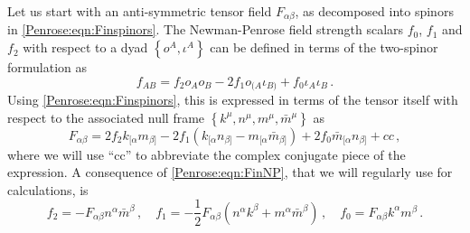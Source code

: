 Let us start with an anti-symmetric tensor field $F_{\alpha \beta}$, as decomposed into spinors in \eqref{Penrose:eqn:Finspinors}. The Newman-Penrose field strength scalars $f_0$, $f_1$ and $f_2$ with respect to a dyad  $\left\lbrace o^A, \iota^A \right \rbrace$ can be defined in terms of the two-spinor formulation as
\begin{equation}
f_{AB} = f_2 o_A o_B - 2 f_1 o_{(A} \iota_{B)} + f_0 \iota_A \iota_B \, .
\end{equation}
Using \eqref{Penrose:eqn:Finspinors}, this is expressed in terms of the tensor itself with respect to the associated null frame $\left\lbrace k^{\mu}, n^{\mu}, m^{\mu}, \bar{m}^{\mu} \right \rbrace$ as
\begin{equation}\label{Penrose:eqn:FinNP}
F_{\alpha \beta} = 2 f_2 k_{[\alpha} m_{\beta]}- 2 f_1 \left(k_{[\alpha} n_{\beta]}-m_{[\alpha}\bar{m}_{\beta]}\right) + 2 f_0 \bar{m}_{[\alpha} n_{\beta]} +  cc  \, ,
\end{equation}
where we will use ``cc'' to abbreviate the complex conjugate piece of the expression. A consequence of \eqref{Penrose:eqn:FinNP}, that we will regularly use for calculations, is
\begin{equation}\label{Penrose:eqn:finFprojected}
f_2 = - F_{\alpha \beta} n^{\alpha} \bar{m}^{\beta} \, , \quad f_1 = - \frac{1}{2}F_{\alpha \beta} \left(n^{\alpha} k^{\beta}+  m^{\alpha} \bar{m}^{\beta}\right) \, , \quad f_0 =  F_{\alpha \beta} k^{\alpha} m^{\beta} \, .
\end{equation}

